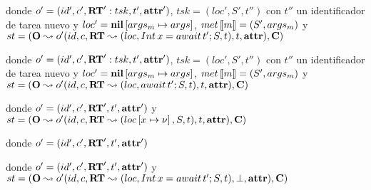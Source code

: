 \begin{landscape}
   \begin{prooftree*}
   \end{prooftree*} donde $o' = (id', c', \textbf{RT}':tsk, t', \textbf{attr}')$, $tsk = (loc', S', t'')$ con $t''$ un identificador de tarea nuevo y $loc' = \textbf{nil}\left[ args_m\mapsto args \right]$, $met\left\llbracket m \right\rrbracket = (S', args_m)$ y $st = (\mathbf{O} \leadsto o' (id, c, \textbf{RT} \leadsto (loc, Int\,x = await\,t'\mbox{;\,} S, t), t, \textbf{attr}), \mathbf{C})$

   \begin{prooftree*}
   \end{prooftree*} donde $o' = (id', c', \textbf{RT}':tsk, t', \textbf{attr}')$, $tsk = (loc', S', t'')$ con $t''$ un identificador de tarea nuevo y $loc' = \textbf{nil}\left[ args_m\mapsto args \right]$, $met\left\llbracket m \right\rrbracket = (S', args_m)$ y $st = (\mathbf{O} \leadsto o' (id, c, \textbf{RT} \leadsto (loc, await\,t'\mbox{;\,} S, t), t, \textbf{attr}), \mathbf{C})$

  \begin{prooftree*}
  \end{prooftree*} donde $o' = (id', c', \textbf{RT}', t', \textbf{attr}')$ y $st = (\mathbf{O} \leadsto o' (id, c, \textbf{RT} \leadsto (loc\left[ x\mapsto\nu \right], S, t), t, \textbf{attr}), \mathbf{C})$

  \begin{prooftree*}
  \end{prooftree*} donde $o' = (id', c', \textbf{RT}', t', \textbf{attr}')$

  \begin{prooftree*}
  \end{prooftree*} donde $o' = (id', c', \textbf{RT}', t', \textbf{attr}')$ y $st = (\mathbf{O} \leadsto o' (id, c, \textbf{RT} \leadsto (loc, Int\,x = await\,t'\mbox{;\,} S, t), \perp, \textbf{attr}), \mathbf{C})$


\end{landscape}

